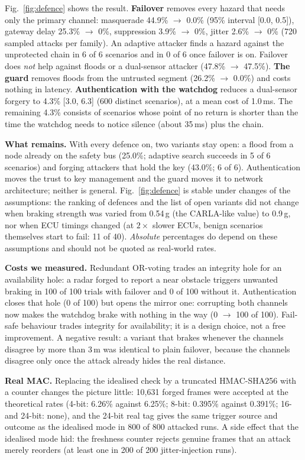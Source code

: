 \documentclass[conference]{IEEEtran}
\begin{document}
Fig.~\ref{fig:defence} shows the result. \textbf{Failover} removes every hazard that needs only the primary channel: masquerade 44.9\% $\rightarrow$ 0.0\% (95\% interval [0.0, 0.5]), gateway delay 25.3\% $\rightarrow$ 0\%, suppression 3.9\% $\rightarrow$ 0\%, jitter 2.6\% $\rightarrow$ 0\% (720 sampled attacks per family). An adaptive attacker finds a hazard against the unprotected chain in 6 of 6 scenarios and in 0 of 6 once failover is on. Failover does \emph{not} help against floods or a dual-sensor attacker (47.8\% $\rightarrow$ 47.5\%). \textbf{The guard} removes floods from the untrusted segment (26.2\% $\rightarrow$ 0.0\%) and costs nothing in latency. \textbf{Authentication with the watchdog} reduces a dual-sensor forgery to 4.3\% [3.0, 6.3] (600 distinct scenarios), at a mean cost of 1.0\,ms. The remaining 4.3\% consists of scenarios whose point of no return is shorter than the time the watchdog needs to notice silence (about 35\,ms) plus the chain.

\textbf{What remains.} With every defence on, two variants stay open: a flood from a node already on the safety bus (25.0\%; adaptive search succeeds in 5 of 6 scenarios) and forging attackers that hold the key (43.0\%; 6 of 6). Authentication moves the trust to key management and the guard moves it to network architecture; neither is general. Fig.~\ref{fig:defence} is stable under changes of the assumptions: the ranking of defences and the list of open variants did not change when braking strength was varied from 0.54\,g (the CARLA-like value) to 0.9\,g, nor when ECU timings changed (at $2\times$ slower ECUs, benign scenarios themselves start to fail: 11 of 40). \emph{Absolute} percentages do depend on these assumptions and should not be quoted as real-world rates.

\textbf{Costs we measured.} Redundant OR-voting trades an integrity hole for an availability hole: a radar forged to report a near obstacle triggers unwanted braking in 100 of 100 trials with failover and 0 of 100 without it. Authentication closes that hole (0 of 100) but opens the mirror one: corrupting both channels now makes the watchdog brake with nothing in the way (0 $\rightarrow$ 100 of 100). Fail-safe behaviour trades integrity for availability; it is a design choice, not a free improvement. A negative result: a variant that brakes whenever the channels disagree by more than 3\,m was identical to plain failover, because the channels disagree only once the attack already hides the real distance.

\textbf{Real MAC.} Replacing the idealised check by a truncated HMAC-SHA256 with a counter changes the picture little: 10{,}631 forged frames were accepted at the theoretical rates (4-bit: 6.26\% against 6.25\%; 8-bit: 0.395\% against 0.391\%; 16- and 24-bit: none), and the 24-bit real tag gives the same trigger source and outcome as the idealised mode in 800 of 800 attacked runs. A side effect that the idealised mode hid: the freshness counter rejects genuine frames that an attack merely reorders (at least one in 200 of 200 jitter-injection runs).
\end{document}
